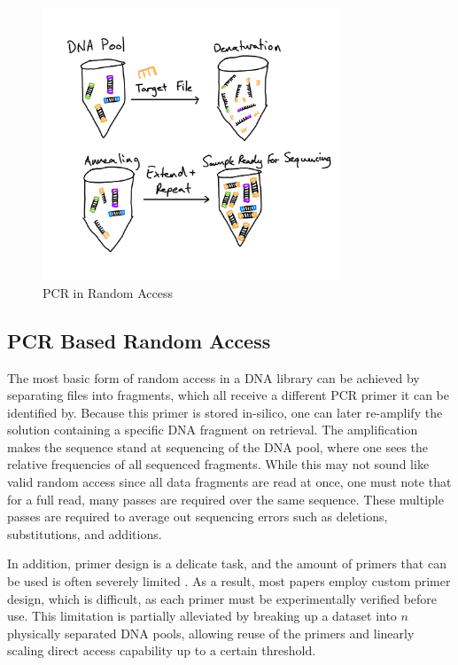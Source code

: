 \documentclass[a4paper,conference]{IEEEtran}
\begin{document}
\begin{figure}[!t]
\centering
\includegraphics[width=3.5in]{pcrRA}
\caption{PCR in Random Access}
\label{fig_sim}
\end{figure}


\subsection{PCR Based Random Access}
The most basic form of random access in a DNA library can be achieved by separating files into fragments, which all receive a different PCR primer it can be identified by. Because this primer is stored in-silico, one can later re-amplify the solution containing a specific DNA fragment on retrieval. The amplification makes the sequence stand at sequencing of the DNA pool, where one sees the relative frequencies of all sequenced fragments. While this may not sound like valid random access since all data fragments are read at once, one must note that for a full read, many passes are required over the same sequence. These multiple passes are required to average out sequencing errors such as deletions, substitutions, and additions.

In addition, primer design is a delicate task, and the amount of primers that can be used is often severely limited \cite{}. As a result, most papers employ custom primer design, which is difficult, as each primer must be experimentally verified before use. This limitation is partially alleviated by breaking up a dataset into $n$ physically separated DNA pools, allowing reuse of the primers and linearly scaling direct access capability up to a certain threshold.
\end{document}
